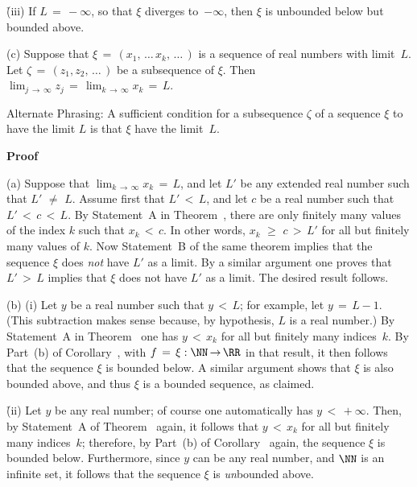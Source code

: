         \h (iii) If $L \,=\, -{\infty}$, so that ${\xi}$ diverges to~$-{\infty}$,
    then ${\xi}$ is unbounded below but bounded above.

\V

        (c) Suppose that ${\xi} \,=\, (x_{1},\,{\ldots}\,x_{k},\,{\ldots}\,)$ is
a sequence of real numbers with limit~$L$.
    Let ${\zeta} \,=\, (z_{1},z_{2},\,{\ldots}\,)$ be a subsequence of ${\xi}$.
    Then $\lim_{j \,{\rightarrow}\, {\infty}} z_{j} \,=\, \lim_{k \,{\rightarrow}\, {\infty}} x_{k} \,=\, L$.

        Alternate Phrasing: A sufficient condition for a subsequence ${\zeta}$ of a sequence ${\xi}$ to have the limit $L$ is that ${\xi}$ have the limit~$L$.

\V

        {\bf Proof}

\V

        (a) Suppose that $\lim_{k \,{\rightarrow}\, {\infty}} x_{k} \,=\, L$, and let $L'$ be any extended real number such that $L' \,\,{\neq}\,\, L$.
    Assume first that $L'\,<\,L$, and let $c$ be a real number such that $L'\,<\,c\,<\,L$.
    By Statement~A in Theorem~, there are only finitely many values of the index $k$ such that $x_{k}\,<\,c$.
    In other words, $x_{k}\,\,{\geq}\,\,c\,>\,L'$ for all but finitely many values of $k$.
    Now Statement~B of the same theorem implies that the sequence ${\xi}$ does {\em not} have $L'$ as a limit.
    By a similar argument one proves that $L'\,>\,L$ implies that ${\xi}$ does not have $L'$ as a limit. The desired result follows.
    

\V

        (b) (i) Let $y$ be a real number such that $y\,<\,L$; for example, let $y \,=\, L-1$.
    (This subtraction makes sense because, by hypothesis, $L$ is a real number.)
    By Statement~A in Theorem~ one has $y\,<\,x_{k}$ for all but finitely many indices~$k$.
    By Part~(b) of Corollary~, with $f \,=\, {\xi}:{\NN} \,{\rightarrow}\, {\RR}$ in that result,
    it then follows that the sequence ${\xi}$ is bounded below. A similar argument shows that ${\xi}$ is also bounded above, and thus ${\xi}$ is a bounded sequence, as claimed.


        \h (ii) Let $y$ be any real number; of course one automatically has $y\,<\,+{\infty}$.
    Then, by Statement~A of Theorem~ again, it follows that $y\,<\,x_{k}$ for all but finitely many indices~$k$;
    therefore, by Part~(b) of Corollary~ again, the sequence ${\xi}$ is bounded below. Furthermore, since $y$ can be any real number,
    and ${\NN}$ is an infinite set, it follows that the sequence ${\xi}$ is {\em un}bounded above.

